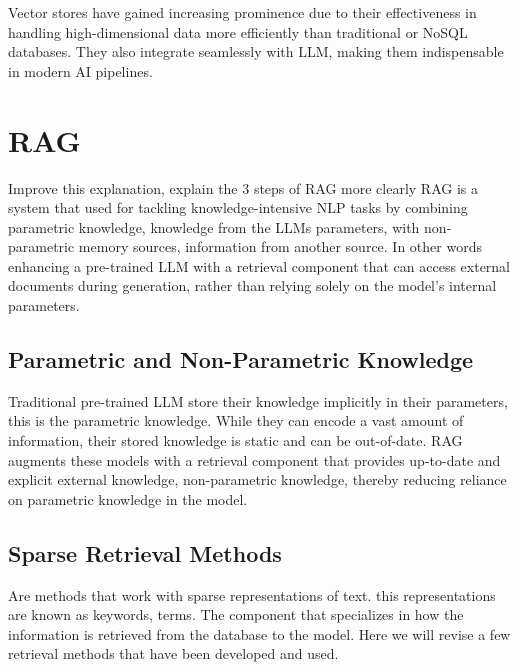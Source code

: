 Vector stores have gained increasing prominence due to their effectiveness in handling high-dimensional data more efficiently than traditional or NoSQL databases. They also integrate seamlessly with \ac{LLM}, making them indispensable in modern AI pipelines.


\section{\acl{RAG}}
Improve this explanation, explain the 3 steps of RAG more clearly
\ac{RAG} is a system that used for tackling knowledge-intensive \ac{NLP} tasks by combining parametric knowledge, knowledge from the \ac{LLM}s parameters,  with non-parametric memory sources, information from another source. In other words enhancing a pre-trained \ac{LLM} with a retrieval component that can access external documents during generation, rather than relying solely on the model's internal parameters.
\subsection{Parametric and Non-Parametric Knowledge}
Traditional pre-trained \ac{LLM} store their knowledge implicitly in their parameters, this is the parametric knowledge. While they can encode a vast amount of information, their stored knowledge is static and can be out-of-date. \ac{RAG} augments these models with a retrieval component that provides up-to-date and explicit external knowledge, non-parametric knowledge, thereby reducing reliance on parametric knowledge in the model.

\subsection{Sparse Retrieval Methods}
Are methods that work with sparse representations of text. this representations are known as keywords, terms.
The component that specializes in how the information is retrieved from the database to the model. Here we will revise a few retrieval methods that have been developed and used.
